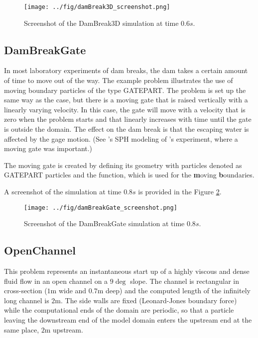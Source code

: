 \documentclass{../GPUSPHtemplate}
\begin{document}
\begin{figure}[h]
  \begin{center}
    \texttt{[image: ../fig/damBreak3D\_screenshot.png]}
    \caption{Screenshot of the DamBreak3D simulation at time $0.6s$.}\label{fig:DamBreak3D}   
  \end{center}
\end{figure}

\subsection{DamBreakGate}

In most laboratory experiments of dam breaks, the dam takes a certain
amount of time to move out of the way. The example problem
 illustrates the use of moving boundary particles of
the type GATEPART. The problem is set up the same way as the
 case, but there is a moving gate that is raised
vertically with a linearly varying velocity. In this case, the gate will
move with a velocity that is zero when the problem starts and that
linearly increases with time until the gate is outside the domain. The
effect on the dam break is that the escaping water is affected by the
gage motion. (See \cite{crespo_modeling_2008}'s SPH modeling of
\cite{janosi_turbulent_2004}'s experiment, where a moving gate was important.)

The moving gate is created by defining its geometry with particles
denoted as GATEPART particles and the  function, which
is used for the \textbf{m}oving \textbf{b}oundaries.

A screenshot of the simulation at time $0.8s$ is provided
in the Figure \ref{fig:DamBreakGate}.

\begin{figure}[h]
  \begin{center}
    \texttt{[image: ../fig/damBreakGate\_screenshot.png]}
    \caption{Screenshot of the DamBreakGate simulation at time $0.8s$.}\label{fig:DamBreakGate}   
  \end{center}
\end{figure}

\subsection{OpenChannel}

This problem represents an instantaneous start up of a highly viscous
and dense fluid flow in an open channel on a $9\deg$ slope. The
channel is rectangular in cross-section ($1$m wide and $0.7$m deep) and
the computed length of the infinitely long channel is $2$m. The side
walls are fixed (Leonard-Jones boundary force) while the computational
ends of the domain are periodic, so that a particle leaving the
downstream end of the model domain enters the upstream end at the same
place, $2$m upstream.
\end{document}
